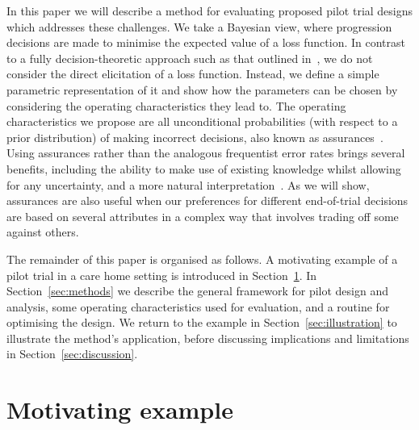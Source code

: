 \documentclass{article} %
\begin{document}
In this paper we will describe a method for evaluating proposed pilot trial designs which addresses these challenges. We take a Bayesian view, where progression decisions are made to minimise the expected value of a loss function. In contrast to a fully decision-theoretic approach such as that outlined in~\cite{Lindley1997}, we do not consider the direct elicitation of a loss function. Instead, we define a simple parametric representation of it and show how the parameters can be chosen by considering the operating characteristics they lead to. The operating characteristics we propose are all unconditional probabilities (with respect to a prior distribution) of making incorrect decisions, also known as assurances~\cite{OHagan2005}. Using assurances rather than the analogous frequentist error rates brings several benefits, including the ability to make use of existing knowledge whilst allowing for any uncertainty, and a more natural interpretation~\cite{Crisp2018}. As we will show, assurances are also useful when our preferences for different end-of-trial decisions are based on several attributes in a complex way that involves trading off some against others.


The remainder of this paper is organised as follows. A motivating example of a pilot trial in a care home setting is introduced in Section~\ref{sec:motivating}. In Section~\ref{sec:methods} we describe the general framework for pilot design and analysis, some operating characteristics used for evaluation, and a routine for optimising the design. We return to the example in Section~\ref{sec:illustration} to illustrate the method's application, before discussing implications and limitations in Section~\ref{sec:discussion}.

\section{Motivating example}\label{sec:motivating}
\end{document}
